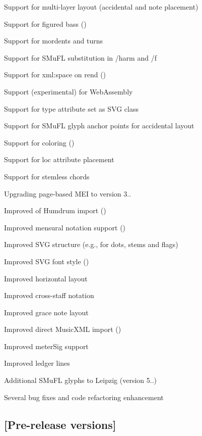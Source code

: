 \begin{DoxyItemize}
\item Support for multi-\/layer layout (accidental and note placement)
\item Support for figured bass ()
\item Support for mordents and turns
\item Support for S\+Mu\+FL substitution in /harm and /f
\item Support for xml\+:space on rend ()
\item Support (experimental) for Web\+Assembly
\item Support for type attribute set as S\+VG class
\item Support for S\+Mu\+FL glyph anchor points for accidental layout
\item Support for coloring ()
\item Support for loc attribute placement
\item Support for stemless chords
\item Upgrading page-\/based M\+EI to version 3..
\item Improved of Humdrum import ()
\item Improved mensural notation support ()
\item Improved S\+VG structure (e.\+g., for dots, stems and flags)
\item Improved S\+VG font style ()
\item Improved horizontal layout
\item Improved cross-\/staff notation
\item Improved grace note layout
\item Improved direct Music\+X\+ML import ()
\item Improved meter\+Sig support
\item Improved ledger lines
\item Additional S\+Mu\+FL glyphs to Leipzig (version 5..)
\item Several bug fixes and code refactoring enhancement
\end{DoxyItemize}

\subsection*{\mbox{[}Pre-\/release versions\mbox{]}}


